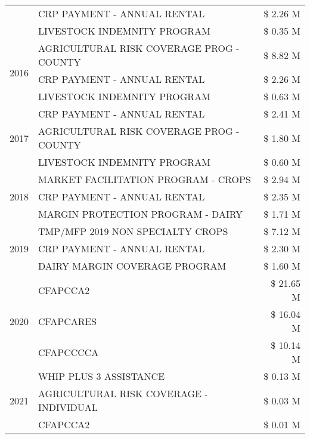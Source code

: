\begin{tabular}{llr}
 & CRP PAYMENT - ANNUAL RENTAL & \$ 2.26 M \\
 & LIVESTOCK INDEMNITY PROGRAM & \$ 0.35 M \\
\cline{1-3}
\multirow[t]{3}{*}{2016} & AGRICULTURAL RISK COVERAGE PROG - COUNTY & \$ 8.82 M \\
 & CRP PAYMENT - ANNUAL RENTAL & \$ 2.26 M \\
 & LIVESTOCK INDEMNITY PROGRAM & \$ 0.63 M \\
\cline{1-3}
\multirow[t]{3}{*}{2017} & CRP PAYMENT - ANNUAL RENTAL & \$ 2.41 M \\
 & AGRICULTURAL RISK COVERAGE PROG - COUNTY & \$ 1.80 M \\
 & LIVESTOCK INDEMNITY PROGRAM & \$ 0.60 M \\
\cline{1-3}
\multirow[t]{3}{*}{2018} & MARKET FACILITATION PROGRAM - CROPS & \$ 2.94 M \\
 & CRP PAYMENT - ANNUAL RENTAL & \$ 2.35 M \\
 & MARGIN PROTECTION PROGRAM - DAIRY & \$ 1.71 M \\
\cline{1-3}
\multirow[t]{3}{*}{2019} & TMP/MFP 2019 NON SPECIALTY CROPS & \$ 7.12 M \\
 & CRP PAYMENT - ANNUAL RENTAL & \$ 2.30 M \\
 & DAIRY MARGIN COVERAGE PROGRAM & \$ 1.60 M \\
\cline{1-3}
\multirow[t]{3}{*}{2020} & CFAPCCA2 & \$ 21.65 M \\
 & CFAPCARES & \$ 16.04 M \\
 & CFAPCCCCA & \$ 10.14 M \\
\cline{1-3}
\multirow[t]{3}{*}{2021} & WHIP PLUS 3 ASSISTANCE & \$ 0.13 M \\
 & AGRICULTURAL RISK COVERAGE - INDIVIDUAL & \$ 0.03 M \\
 & CFAPCCA2 & \$ 0.01 M \\
\cline{1-3}
\bottomrule
\end{tabular}
